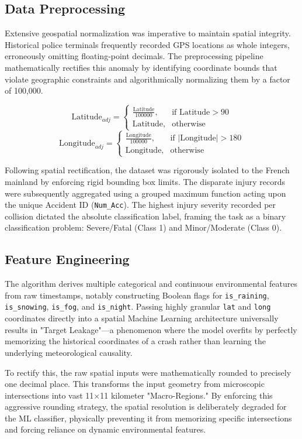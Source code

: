\documentclass[conference]{IEEEtran}
\begin{document}
\subsection{Data Preprocessing}
Extensive geospatial normalization was imperative to maintain spatial integrity. Historical police terminals frequently recorded GPS locations as whole integers, erroneously omitting floating-point decimals. The preprocessing pipeline mathematically rectifies this anomaly by identifying coordinate bounds that violate geographic constraints and algorithmically normalizing them by a factor of 100,000. 

$$ \text{Latitude}_{adj} = \begin{cases} \frac{\text{Latitude}}{100000}, & \text{if Latitude} > 90 \\ \text{Latitude}, & \text{otherwise} \end{cases} $$
$$ \text{Longitude}_{adj} = \begin{cases} \frac{\text{Longitude}}{100000}, & \text{if } |\text{Longitude}| > 180 \\ \text{Longitude}, & \text{otherwise} \end{cases} $$

Following spatial rectification, the dataset was rigorously isolated to the French mainland by enforcing rigid bounding box limits. The disparate injury records were subsequently aggregated using a grouped maximum function acting upon the unique Accident ID (\texttt{Num\_Acc}). The highest injury severity recorded per collision dictated the absolute classification label, framing the task as a binary classification problem: Severe/Fatal (Class 1) and Minor/Moderate (Class 0).

\subsection{Feature Engineering}
The algorithm derives multiple categorical and continuous environmental features from raw timestamps, notably constructing Boolean flags for \texttt{is\_raining}, \texttt{is\_snowing}, \texttt{is\_fog}, and \texttt{is\_night}. Passing highly granular \texttt{lat} and \texttt{long} coordinates directly into a spatial Machine Learning architecture universally results in "Target Leakage"—a phenomenon where the model overfits by perfectly memorizing the historical coordinates of a crash rather than learning the underlying meteorological causality. 

To rectify this, the raw spatial inputs were mathematically rounded to precisely one decimal place. This transforms the input geometry from microscopic intersections into vast 11$\times$11 kilometer "Macro-Regions." By enforcing this aggressive rounding strategy, the spatial resolution is deliberately degraded for the ML classifier, physically preventing it from memorizing specific intersections and forcing reliance on dynamic environmental features.
\end{document}
